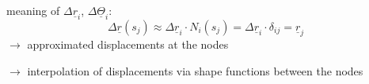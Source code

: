 \begin{frame}
\begin{multicols}{2}
    \vspace{0.5em}
    meaning of $\Delta \underline{r}_i$, $\Delta \underline{\Theta}_i$:
    \begin{displaymath}
      \Delta \underline{r}(s_j) \approx \Delta \underline{r}_i \cdot N_i(s_j) =
      \Delta \underline{r}_i \cdot \delta_{ij} = \underline{r}_j
    \end{displaymath}
    $\rightarrow$ approximated displacements at the nodes
    
    \vspace{0.3em}
    $\rightarrow$ interpolation of displacements via \newline
    \null \quad \:shape functions between the nodes
    
  \end{multicols}
\end{frame}


